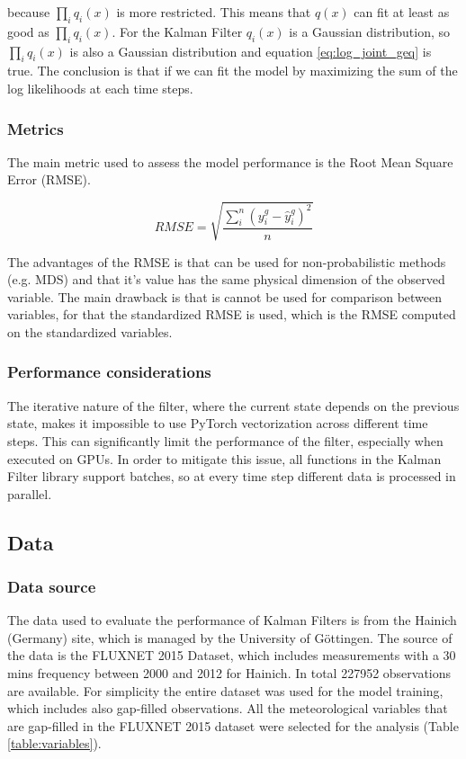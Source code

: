\documentclass{article}
\let\Oldsubsection\subsection
\renewcommand{\subsection}{\FloatBarrier\Oldsubsection}
\begin{document}
because $\prod_i q_i(x)$ is more restricted. This means that $q(x)$ can fit at least as good as $\prod_i q_i(x)$.
For the Kalman Filter $q_i(x)$ is a Gaussian distribution, so $\prod_i q_i(x)$ is also a Gaussian distribution and equation \ref{eq:log_joint_geq} is true. The conclusion is that if we can fit the model by maximizing the sum of the log likelihoods at each time steps.

\subsubsection{Metrics}

The main metric used to assess the model performance is the Root Mean Square Error (RMSE). 

\begin{equation}
    RMSE = \sqrt{\frac{\sum_i^n (y^g_i - \hat{y}^g_i)^2}{n}}
\end{equation}

The advantages of the RMSE is that can be used for non-probabilistic methods (e.g. MDS) and that it's value has the same physical dimension of the observed variable. The main drawback is that is cannot be used for comparison between variables, for that the standardized RMSE is used, which is the RMSE computed on the standardized variables.

\subsubsection{Performance considerations} 

The iterative nature of the filter, where the current state depends on the previous state, makes it impossible to use PyTorch vectorization across different time steps. This can significantly limit the performance of the filter, especially when executed on GPUs. In order to  mitigate this issue, all functions in the Kalman Filter library support batches, so at every time step different data is processed in parallel.


\subsection{Data}

\subsubsection{Data source}

The data used to evaluate the performance of Kalman Filters is from the Hainich (Germany) site, which is managed by the University of Göttingen. The source of the data is  the FLUXNET 2015 Dataset, which includes measurements with a 30 mins frequency between 2000 and 2012 for Hainich. In total 227952 observations are available. For simplicity the entire dataset was used for the model training, which includes also gap-filled observations.
All the meteorological variables that are gap-filled in the FLUXNET 2015 dataset were selected for the analysis (Table \ref{table:variables}).
\end{document}
